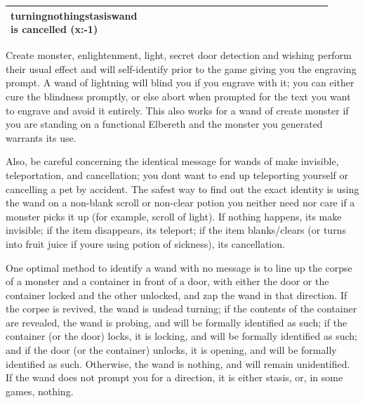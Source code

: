 {\begin{longtable}{|>{\RaggedRight}p{0.31029\linewidth}|>{\RaggedRight}p{0.31029\linewidth}|>{\RaggedRight}p{0.29371\linewidth}|}
turning\footnotemark[163]\newline{}nothing\footnotemark[164]\newline{}stasis\footnotemark[165]\newline{}wand is cancelled (x:-{}1)\newline{}&\hspace*{0pt}\ignorespaces{}\hspace*{0pt}\\ \hline 
\end{longtable}
}
Create monster, enlightenment, light, secret door detection and wishing perform their usual effect and will self-{}identify prior to the game giving you the engraving prompt. A wand of lightning will blind you if you engrave with it; you can either cure the blindness promptly, or else abort when prompted for the text you want to engrave and avoid it entirely. This also works for a wand of create monster if you are standing on a functional Elbereth and the monster you generated warrants its use.


Also, be careful concerning the identical message for wands of make invisible, teleportation, and cancellation; you don\textquotesingle{}t want to end up teleporting yourself or cancelling a pet by accident. The safest way to find out the exact identity is using the wand on a non-{}blank scroll or non-{}clear potion you neither need nor care if a monster picks it up (for example, scroll of light\footnotemark[166]). If nothing happens, it\textquotesingle{}s make invisible; if the item disappears, it\textquotesingle{}s teleport; if the item blanks/clears (or turns into fruit juice if you\textquotesingle{}re using potion of sickness\footnotemark[167]), it\textquotesingle{}s cancellation.


One optimal method to identify a wand with no message is to line up the corpse of a monster and a container\footnotemark[168] in front of a door, with either the door or the container locked and the other unlocked, and zap the wand in that direction. If the corpse is revived, the wand is undead turning; if the contents of the container are revealed, the wand is probing\footnotemark[169], and will be formally identified as such; if the container (or the door) locks, it is locking\footnotemark[170], and will be formally identified as such; and if the door (or the container) unlocks, it is opening\footnotemark[171], and will be formally identified as such. Otherwise, the wand is nothing\footnotemark[172], and will remain unidentified. If the wand does not prompt you for a direction, it is either stasis\footnotemark[173], or, in some games, nothing.



